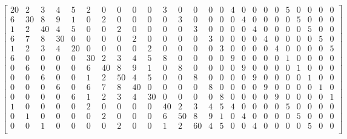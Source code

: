 \documentclass{article}
\begin{document}
\begin{mdDiv}[class={math,para-block},elem={math},data-line={95}]%
\begin{mdDiv}[class={mathdisplay,para-block,input-math},elem={mathdisplay},color={},math-needpdf={},line-adjust={0},data-line={96}]%
\begin{mdDiv}[class={mathdisplay,math-display},color={},math-needpdf={}]%
\[%
\begin{bmatrix}
20 &  2 &  3 &  4 &  5 &  2 &  0 &  0 &  0 &  0 &  3 &  0 &  0 &  0 &  0 &  4 &  0 &  0 &  0 &  0 &  5 &  0 &  0 &  0 &  0 \\
6  & 30 &  8 &  9 &  1 &  0 &  2 &  0 &  0 &  0 &  0 &  3 &  0 &  0 &  0 &  0 &  4 &  0 &  0 &  0 &  0 &  5 &  0 &  0 &  0 \\
1  & 2  & 40 &  4 &  5 &  0 &  0 &  2 &  0 &  0 &  0 &  0 &  3 &  0 &  0 &  0 &  0 &  4 &  0 &  0 &  0 &  0 &  5 &  0 &  0 \\
6  & 7  & 8  & 30 &  0 &  0 &  0 &  0 &  2 &  0 &  0 &  0 &  0 &  3 &  0 &  0 &  0 &  0 &  4 &  0 &  0 &  0 &  0 &  5 &  0 \\
1  & 2  & 3  & 4  & 20 &  0 &  0 &  0 &  0 &  2 &  0 &  0 &  0 &  0 &  3 &  0 &  0 &  0 &  0 &  4 &  0 &  0 &  0 &  0 &  5 \\
6  & 0  & 0  & 0  & 0  & 30 &  2 &  3 &  4 &  5 &  8 &  0 &  0 &  0 &  0 &  9 &  0 &  0 &  0 &  0 &  1 &  0 &  0 &  0 &  0 \\
0  & 6  & 0  & 0  & 0  & 6  & 40 &  8 &  9 &  1 &  0 &  8 &  0 &  0 &  0 &  0 &  9 &  0 &  0 &  0 &  0 &  1 &  0 &  0 &  0 \\
0  & 0  & 6  & 0  & 0  & 1  & 2  & 50 &  4 &  5 &  0 &  0 &  8 &  0 &  0 &  0 &  0 &  9 &  0 &  0 &  0 &  0 &  1 &  0 &  0 \\
0  & 0  & 0  & 6  & 0  & 6  & 7  & 8  & 40 &  0 &  0 &  0 &  0 &  8 &  0 &  0 &  0 &  0 &  9 &  0 &  0 &  0 &  0 &  1 &  0 \\
0  & 0  & 0  & 0  & 6  & 1  & 2  & 3  & 4  & 30 &  0 &  0 &  0 &  0 &  8 &  0 &  0 &  0 &  0 &  9 &  0 &  0 &  0 &  0 &  1 \\
1  & 0  & 0  & 0  & 0  & 2  & 0  & 0  & 0  & 0  & 40 &  2 &  3 &  4 &  5 &  4 &  0 &  0 &  0 &  0 &  5 &  0 &  0 &  0 &  0 \\
0  & 1  & 0  & 0  & 0  & 0  & 2  & 0  & 0  & 0  & 6  & 50 &  8 &  9 &  1 &  0 &  4 &  0 &  0 &  0 &  0 &  5 &  0 &  0 &  0 \\
0  & 0  & 1  & 0  & 0  & 0  & 0  & 2  & 0  & 0  & 1  & 2  & 60 &  4 &  5 &  0 &  0 &  4 &  0 &  0 &  0 &  0 &  5 &  0 &  0 \\

\end{bmatrix}\]
\end{mdDiv}
\end{mdDiv}
\end{mdDiv}
\end{document}
